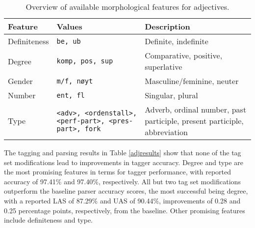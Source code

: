 \documentclass[a4paper,12pt,english]{book}
\begin{document}
\begin{table}
    \centering
    \smaller[0.5]
    \begin{tabular}{@{}lp{5cm}p{5cm}@{}}
        \toprule
        \textbf{Feature} & \textbf{Values} & \textbf{Description} \\
        \midrule
        Definiteness & \texttt{be, ub} & Definite, indefinite \\
        Degree & \texttt{komp, pos, sup} & Comparative, positive, superlative \\
        Gender & \texttt{m/f, nøyt} & Masculine/feminine, neuter \\
        Number & \texttt{ent, fl} & Singular, plural \\
        Type & \texttt{<adv>, <ordenstall>, <perf-part>, <pres-part>, fork} &
        Adverb, ordinal number, past participle, present participle,
        abbreviation \\
        \bottomrule
    \end{tabular}
    \caption{Overview of available morphological features for adjectives.}
    \label{adjfeatures}
\end{table}

The tagging and parsing results in Table \ref{adjresults} show that none of the
tag set modifications lead to improvements in tagger accuracy. Degree and type
are the most promising features in terms for tagger performance, with reported
accuracy of 97.41\% and 97.40\%, respectively. All but two tag set
modifications outperform the baseline parser accuracy scores, the most
successful being degree, with a reported LAS of 87.29\% and UAS of 90.44\%,
improvements of 0.28 and 0.25 percentage points, respectively, from the
baseline. Other promising features include definiteness and type.
\end{document}
